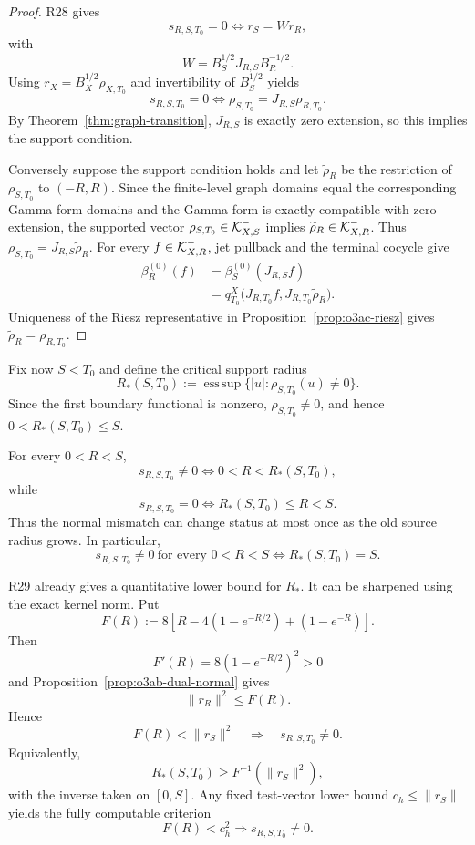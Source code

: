 \begin{proof}
R28 gives
\[
 s_{R,S,T_0}=0\iff r_S=Wr_R,
\]
with
\[
 W=B_S^{1/2}J_{R,S}B_R^{-1/2}.
\]
Using $r_X=B_X^{1/2}\rho_{X,T_0}$ and invertibility of $B_S^{1/2}$ yields
\[
 s_{R,S,T_0}=0
 \iff
 \rho_{S,T_0}=J_{R,S}\rho_{R,T_0}.
\]
By Theorem~\ref{thm:graph-transition}, $J_{R,S}$ is exactly zero extension, so this
implies the support condition.

Conversely suppose the support condition holds and let $\widetilde\rho_R$ be the
restriction of $\rho_{S,T_0}$ to $(-R,R)$.  Since the finite-level graph domains equal
the corresponding Gamma form domains and the Gamma form is exactly compatible with
zero extension, the supported vector $\rho_{S,T_0}\in\mathcal K_{X,S}^-$ implies
$\widetilde\rho_R\in\mathcal K_{X,R}^-$.  Thus
$\rho_{S,T_0}=J_{R,S}\widetilde\rho_R$.  For every $f\in\mathcal K_{X,R}^-$, jet pullback and
the terminal cocycle give
\[
\begin{aligned}
 \beta_R^{(0)}(f)
 &=\beta_S^{(0)}(J_{R,S}f)\\
 &=q_{T_0}^X
 \bigl(J_{R,T_0}f,J_{R,T_0}\widetilde\rho_R\bigr).
\end{aligned}
\]
Uniqueness of the Riesz representative in Proposition~\ref{prop:o3ac-riesz} gives
$\widetilde\rho_R=\rho_{R,T_0}$.
\end{proof}

Fix now $S<T_0$ and define the critical support radius
\[
 \boxed{
 R_*(S,T_0)
 :=\operatorname*{ess\,sup}
 \{|u|:\rho_{S,T_0}(u)\ne0\}.
 }
\tag{O3AC.4}\label{eq:o3ac-Rstar}
\]
Since the first boundary functional is nonzero, $\rho_{S,T_0}\ne0$, and hence
$0<R_*(S,T_0)\le S$.

\begin{corollary}
\label{cor:o3ac-threshold}
For every $0<R<S$,
\[
 \boxed{
 s_{R,S,T_0}\ne0
 \iff0<R<R_*(S,T_0),
 }
\tag{O3AC.5}\label{eq:o3ac-nonzero-threshold}
\]
while
\[
 \boxed{
 s_{R,S,T_0}=0
 \iff R_*(S,T_0)\le R<S.
 }
\tag{O3AC.6}\label{eq:o3ac-zero-threshold}
\]
Thus the normal mismatch can change status at most once as the old source radius grows.
In particular,
\[
 \boxed{
 s_{R,S,T_0}\ne0\ \text{for every }0<R<S
 \iff R_*(S,T_0)=S.
 }
\tag{O3AC.7}\label{eq:o3ac-universal-equivalence}
\]
\end{corollary}

R29 already gives a quantitative lower bound for $R_*$.  It can be sharpened using the
exact kernel norm.  Put
\[
 F(R):=8\left[R-4(1-e^{-R/2})+(1-e^{-R})\right].
\tag{O3AC.8}\label{eq:o3ac-F}
\]
Then
\[
 F'(R)=8(1-e^{-R/2})^2>0
\]
and Proposition~\ref{prop:o3ab-dual-normal} gives
\[
 \|r_R\|^2\le F(R).
\]
Hence
\[
 F(R)<\|r_S\|^2
 \quad\Longrightarrow\quad
 s_{R,S,T_0}\ne0.
\tag{O3AC.9}\label{eq:o3ac-F-test}
\]
Equivalently,
\[
 \boxed{
 R_*(S,T_0)\ge F^{-1}(\|r_S\|^2),
 }
\tag{O3AC.10}\label{eq:o3ac-Rstar-lower}
\]
with the inverse taken on $[0,S]$.  Any fixed test-vector lower bound
$c_h\le\|r_S\|$ yields the fully computable criterion
\[
 F(R)<c_h^2\Longrightarrow s_{R,S,T_0}\ne0.
\tag{O3AC.11}\label{eq:o3ac-test-threshold}
\]

